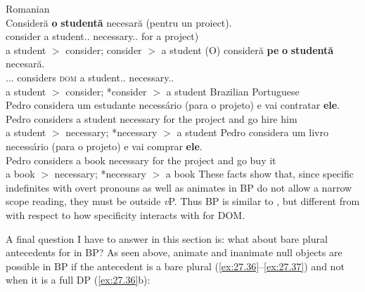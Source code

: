 \documentclass[output=paper]{langsci/langscibook}
\begin{document}
\ea\label{ex:27.34} Romanian\\
    \ea
        \gll Consideră \textbf{o}    \textbf{studentă} necesară       (pentru un proiect).\\
        consider     a   student.\glossF.\Sg{} necessary.\glossF.\Sg{}   \hphantom{(}for a project)\\
        \glt a student $>$ consider; consider $>$ a student
    \ex
        \gll (O)      consideră \textbf{pe} \textbf{o} \textbf{studentă} necesară.\\
        \hphantom{(}\Cl.\Tsg.\glossF.\Acc{} considers  \textsc{dom}  a student.\glossF.\Sg{}        necessary.\glossF.\Sg{}\\
        \glt a student $>$ consider; *consider $>$ a student
    \z
\ex\label{ex:27.35} Brazilian Portuguese\\
    \ea
        \gll Pedro considera um estudante necessário (para o projeto) e     vai contratar \textbf{ele}.\\
              Pedro considers a    student      necessary     \hphantom{(}for   the project and go   hire         him\\
        \glt a student $>$ necessary; *necessary $>$ a student
    \ex
        \gll Pedro  considera um   livro   necessário   (para o projeto) e vai   comprar \textbf{ele}.\\
            Pedro   considers a       book   necessary   \hphantom{(}for   the   project and go     buy         it\\
        \glt a book $>$ necessary; *necessary $>$ a book
    \z
\z
These facts show that, since specific indefinites with overt pronouns as well
as animates in \gls{BP} do not allow a narrow scope reading, they must be outside
\emph{v}P. Thus \gls{BP} is similar to , but different from  with
respect to how specificity interacts with  for DOM\@.

A final question I have to answer in this section is: what about bare plural
antecedents for  in BP\@? As seen above, animate and
inanimate null objects are possible in \gls{BP} if the
antecedent is a bare plural (\ref{ex:27.36}--\ref{ex:27.37}) and not when it is a full DP
(\ref{ex:27.36}b):\pagebreak
\end{document}
